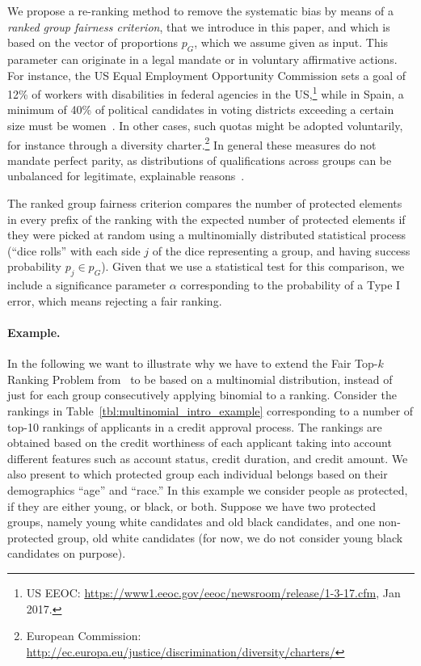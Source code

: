 We propose a re-ranking method to remove the systematic bias by means of a \emph{ranked group fairness criterion}, that we introduce in this paper, and which is based on
the vector of proportions $p_G$, which we assume given as input. This parameter can originate in a legal mandate or in voluntary affirmative actions.
%
For instance, the US Equal Employment Opportunity Commission sets a goal of 12\% of workers with disabilities in federal agencies in the US,\footnote{US EEOC: \url{https://www1.eeoc.gov/eeoc/newsroom/release/1-3-17.cfm}, Jan 2017.}
%
while in Spain, a minimum of 40\% of political candidates in voting districts exceeding a certain size must be women~\cite{verge2010gendering}.
%
In other cases, such quotas might be adopted voluntarily, for instance through a diversity charter.\footnote{European Commission: \url{http://ec.europa.eu/justice/discrimination/diversity/charters/}}
%
In general these measures do not mandate perfect parity, as distributions of qualifications across groups can be unbalanced for legitimate, explainable reasons~\cite{zliobaite2011handling,pedreschi2009integrating}. %
%

The ranked group fairness criterion compares the number of protected elements in every prefix of the ranking with the expected number of protected elements if they were picked at random using a multinomially distributed statistical process (``dice rolls'' with each side $j$ of the dice representing a group, and having success probability $p_j \in p_G$).
%
Given that we use a statistical test for this comparison, we include a significance parameter $\alpha$ corresponding to the probability of a Type I error, which means rejecting a fair ranking.
%

\paragraph{Example.} In the following we want to illustrate why we have to extend the Fair Top-$k$ Ranking Problem from~\citet{zehlike2017fair} to be based on a multinomial distribution, instead of just for each group consecutively applying binomial \algoFAIR to a ranking.
%
Consider the rankings in Table~\ref{tbl:multinomial_intro_example} corresponding to a number of top-10 rankings of applicants in a credit approval process.
%
The rankings are obtained based on the credit worthiness of each applicant taking into account different features such as account status, credit duration, and credit amount.
%
We also present to which protected group each individual belongs based on their demographics ``age'' and ``race.''
%
In this example we consider people as protected, if they are either young, or black, or both.
%
Suppose we have two protected groups, namely young white candidates and old black candidates, and one non-protected group, old white candidates (for now, we do not consider young black candidates on purpose).

